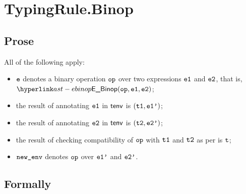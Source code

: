 
\section{TypingRule.Binop \label{sec:TypingRule.Binop}}

\subsection{Prose}
All of the following apply:
\begin{itemize}
  \item $\ve$ denotes a binary operation $\op$ over two expressions $\veone$ and $\vetwo$, that is, \\ $\EBinop(\op, \veone, \vetwo)$;
  \item the result of annotating $\veone$ in $\tenv$ is $(\vtone, \veonep)$\ProseOrTypeError;
  \item the result of annotating $\vetwo$ in $\tenv$ is $(\vttwo, \vetwop)$\ProseOrTypeError;
  \item the result of checking compatibility of $\op$ with $\vtone$ and $\vttwo$ as per 
  is $\vt$\ProseOrTypeError;
  \item $\newenv$ denotes $\op$ over $\veonep$ and $\vetwop$.
\end{itemize}



\subsection{Formally}
\begin{mathpar}
\end{mathpar}

